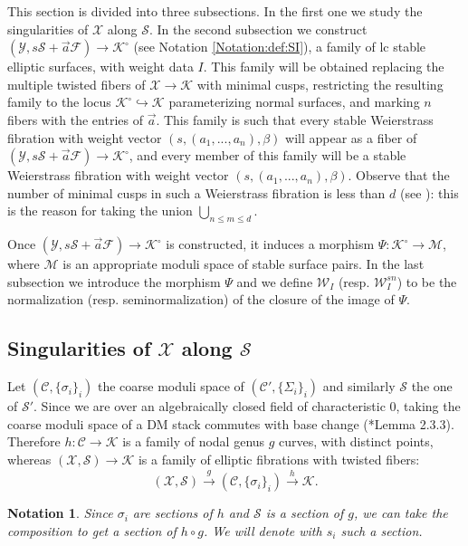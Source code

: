\documentclass[11pt]{amsart}
\newcommand{\cE}{\mathcal{W}}
\newcommand{\sC}{\mathscr{C}}
\newcommand{\sF}{\mathscr{F}}
\newcommand{\sS}{\mathscr{S}}
\newcommand{\sX}{\mathscr{X}}
\newcommand{\Kg}{\mathcal{K}}
\newcommand{\sY}{\mathscr{Y}}
\newtheorem{Notation}[theorem]{Notation}
\theoremstyle{definition}
\begin{document}
This section is divided into three subsections. In the first one we study the singularities of $\sX$ along $\sS$.
In the second subsection
we construct $(\sY,s\sS+\vec{a}\sF) \to \Kg^\circ$ (see Notation \ref{Notation:def:SI}),
a family of lc stable elliptic surfaces, with weight data $I$.
This family will be obtained replacing the multiple twisted fibers of $\sX \to \Kg$ with minimal cusps, restricting the resulting family to the locus $\Kg^\circ \hookrightarrow \Kg$ parameterizing normal surfaces, and marking $n$ fibers with the entries of $\vec{a}$. This family is such that every stable Weierstrass fibration with weight vector $(s,(a_1,...,a_n),\beta)$ will appear as a fiber of $(\sY,s\sS+\vec{a}\sF) \to \Kg^\circ$, and every member of this family will be a stable Weierstrass fibration with weight vector $(s,(a_1,...,a_n),\beta)$. Observe that the number of minimal cusps in such a Weierstrass fibration is less than $d$ (see \cite{Miranda}): this is the reason for taking the union $\bigcup_{n \le m \le d}$. 

Once $(\sY,s\sS+\vec{a}\sF) \to \Kg^\circ$ is constructed, it induces a morphism
$\Psi:\Kg^\circ \to \mathcal{M}$, where $\mathcal{M}$ is an appropriate moduli space of stable surface
pairs.
In the last subsection we introduce the morphism $\Psi$ and we define $\mathcal{W}_{I}$ (resp. $\cE_I^{sn}$) to be the normalization (resp. seminormalization) of the closure of the image of $\Psi$. 
\subsection{Singularities of $\sX$ along $\sS$}\label{subsection:singularities:and:simult:blowup}

Let $(\sC,\{\sigma_i\}_{i})$ the coarse moduli space of $(\sC',\{\Sigma_i\}_{i})$ and similarly $\sS$ the one of $\sS'$.
Since we are over an algebraically closed field of characteristic 0, taking the coarse moduli space of a DM stack commutes with base
change (\cite{AV2}*{Lemma 2.3.3}). Therefore $h:\sC \to \Kg$ is a family of nodal genus $g$ curves, with distinct points,
whereas $(\sX,\sS) \to \Kg$ is a family of elliptic fibrations with twisted fibers:
$$(\sX, \sS) \xrightarrow{g} (\sC,\{\sigma_i\}_i) \xrightarrow{h} \Kg.$$
\begin{Notation} Since $\sigma_i$ are sections of $h$ and $\sS$ is a section of $g$, we can take the composition to get a section of $h \circ g$. We will denote with $s_i$
such a section.\end{Notation}
\end{document}
